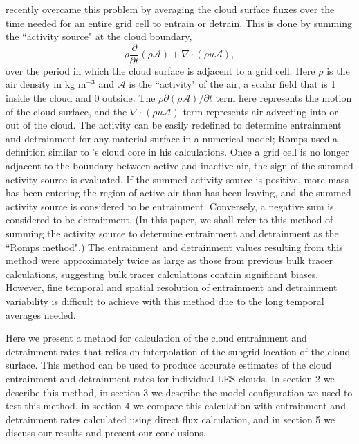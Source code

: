 \documentclass[12pt]{article}
\begin{document}
\cite{Romps2010} recently overcame this problem by averaging the cloud surface 
fluxes over the time needed for an entire grid cell to entrain or detrain.   
This is done by summing the ``activity source" at the cloud boundary, 
\begin{equation}
\label{eq:romps_activity}
  \rho \frac{\partial}{\partial t}(\rho \mathcal{A}) 
  + \nabla \cdot (\rho u \mathcal{A}),
\end{equation}
over the period in which the cloud surface is adjacent to a grid cell.  Here 
$\rho$ is the air density in kg m$^{-3}$ and $\mathcal{A}$ is the ``activity" 
of the air, a scalar field that is 1 inside the cloud and 0 outside.  The 
$\rho \partial(\rho \mathcal{A}) / \partial t$ term here represents the motion 
of the cloud surface, and the $\nabla \cdot (\rho u \mathcal{A})$ term 
represents air advecting into or out of the cloud.  The activity can be easily 
redefined to determine entrainment and detrainment for any material surface in 
a numerical model; Romps used a definition similar to \cite{Siebesma1995}'s 
cloud core in his calculations.  Once a grid cell is no longer adjacent to the 
boundary between active and inactive air, the sign of the summed activity 
source is evaluated.  If the summed activity source is positive, more mass has 
been entering the region of active air than has been leaving, and the summed 
activity source is considered to be entrainment.  Conversely, a negative sum 
is considered to be detrainment.  (In this paper, we shall refer to this method 
of summing the activity source to determine entrainment and detrainment as the 
``Romps method".)  The entrainment and detrainment values resulting from this 
method were approximately twice as large as those from previous bulk tracer 
calculations, suggesting bulk tracer calculations contain significant biases.  
However, fine temporal and spatial resolution of entrainment and detrainment 
variability is difficult to achieve with this method due to the long temporal 
averages needed.

Here we present a method for calculation of the cloud entrainment and 
detrainment rates that relies on interpolation of the subgrid location of 
the cloud surface.  This method can be used to produce accurate estimates of 
the cloud entrainment and detrainment rates for individual LES clouds.  In 
section 2 we describe this method, in section 3 we describe the 
model configuration we used to test this method, in section 4 we compare this 
calculation with entrainment and detrainment rates calculated using 
\cite{Romps2010} direct flux calculation, and in section 5 we discuss 
our results and present our conclusions.  
\end{document}
